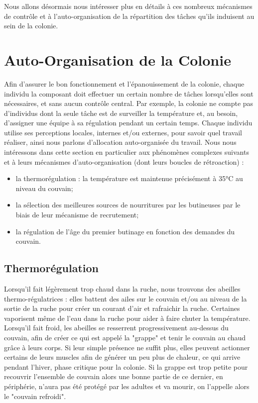 			Nous allons désormais nous intéresser plus en détails à ces nombreux mécanismes de contrôle et à l'auto-organisation de la répartition des tâches qu'ils induisent au sein de la colonie.
			
		\section{Auto-Organisation de la Colonie}
			Afin d'assurer le bon fonctionnement et l'épanouissement de la colonie, chaque individu la composant doit effectuer un certain nombre de tâches lorsqu'elles sont nécessaires, et sans aucun contrôle central. Par exemple, la colonie ne compte pas d'individus dont la seule tâche est de surveiller la température et, au besoin, d'assigner une équipe à sa régulation pendant un certain temps. Chaque individu utilise ses perceptions locales, internes et/ou externes, pour savoir quel travail réaliser, ainsi nous parlons d'allocation auto-organisée du travail. Nous nous intéressons dans cette section en particulier aux phénomènes complexes suivants et à leurs mécanismes d'auto-organisation (dont leurs boucles de rétroaction) :
			
			
			\begin{itemize}
				\item la thermorégulation : la température est maintenue précisément à 35°C au niveau du couvain;
				\item la sélection des meilleures sources de nourritures par les butineuses par le biais de leur mécanisme de recrutement;
				\item la régulation de l'âge du premier butinage en fonction des demandes du couvain.
			\end{itemize}

			\subsection{Thermorégulation}	
			
			Lorsqu'il fait légèrement trop chaud dans la ruche, nous trouvons des abeilles thermo-régulatrices : elles battent des ailes sur le couvain et/ou au niveau de la sortie de la ruche pour créer un courant d'air et rafraichir la ruche. Certaines vaporisent même de l'eau dans la ruche pour aider à faire chuter la température. Lorsqu'il fait froid, les abeilles se resserrent progressivement au-dessus du couvain, afin de créer ce qui est appelé la "grappe" et tenir le couvain au chaud grâce à leurs corps. Si leur simple présence ne suffit plus, elles peuvent actionner certains de leurs muscles afin de générer un peu plus de chaleur, ce qui arrive pendant l'hiver, phase critique pour la colonie. Si la grappe est trop petite pour recouvrir l'ensemble de couvain alors une bonne partie de ce dernier, en périphérie, n'aura pas été protégé par les adultes et va mourir, on l'appelle alors le "couvain refroidi".
					
